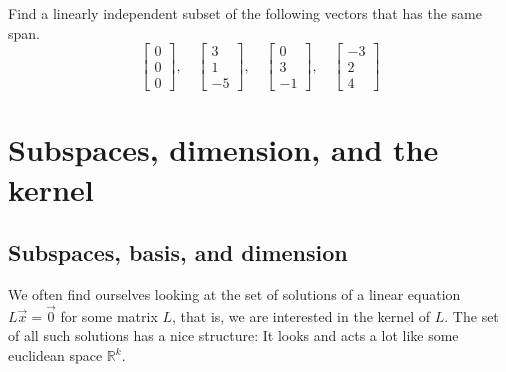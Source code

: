 \begin{exercise}
Find a linearly independent subset of the following vectors that has
the same span.
\begin{equation*}
\begin{bmatrix}
0 \\ 0 \\ 0
\end{bmatrix}
, \quad
\begin{bmatrix}
3 \\ 1 \\ -5
\end{bmatrix}
, \quad
\begin{bmatrix}
0 \\ 3 \\ -1
\end{bmatrix}
, \quad
\begin{bmatrix}
-3 \\ 2 \\ 4
\end{bmatrix}
\end{equation*}
\end{exercise}




\sectionnewpage
\section{Subspaces, dimension, and the kernel}
\label{subspaces:section}


\subsection{Subspaces, basis, and dimension}

We often find ourselves looking at the set of
solutions of a linear equation $L\vec{x} = \vec{0}$ for some matrix $L$,
that is, we are interested in the kernel of $L$.
The set of all such solutions has a nice structure:  It looks and
acts a lot like some euclidean space ${\mathbb R}^k$.

